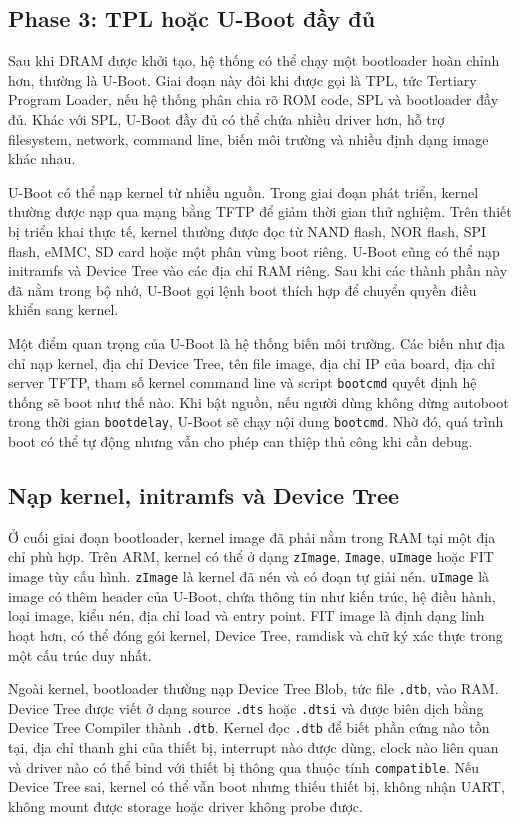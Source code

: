\documentclass[11pt]{article}
\newcommand{\code}[1]{\texttt{#1}}
\begin{document}
\subsection{Phase 3: TPL hoặc U-Boot đầy đủ}

Sau khi DRAM được khởi tạo, hệ thống có thể chạy một bootloader hoàn chỉnh hơn, thường là U-Boot. Giai đoạn này đôi khi được gọi là TPL, tức Tertiary Program Loader, nếu hệ thống phân chia rõ ROM code, SPL và bootloader đầy đủ. Khác với SPL, U-Boot đầy đủ có thể chứa nhiều driver hơn, hỗ trợ filesystem, network, command line, biến môi trường và nhiều định dạng image khác nhau.

U-Boot có thể nạp kernel từ nhiều nguồn. Trong giai đoạn phát triển, kernel thường được nạp qua mạng bằng TFTP để giảm thời gian thử nghiệm. Trên thiết bị triển khai thực tế, kernel thường được đọc từ NAND flash, NOR flash, SPI flash, eMMC, SD card hoặc một phân vùng boot riêng. U-Boot cũng có thể nạp initramfs và Device Tree vào các địa chỉ RAM riêng. Sau khi các thành phần này đã nằm trong bộ nhớ, U-Boot gọi lệnh boot thích hợp để chuyển quyền điều khiển sang kernel.

Một điểm quan trọng của U-Boot là hệ thống biến môi trường. Các biến như địa chỉ nạp kernel, địa chỉ Device Tree, tên file image, địa chỉ IP của board, địa chỉ server TFTP, tham số kernel command line và script \code{bootcmd} quyết định hệ thống sẽ boot như thế nào. Khi bật nguồn, nếu người dùng không dừng autoboot trong thời gian \code{bootdelay}, U-Boot sẽ chạy nội dung \code{bootcmd}. Nhờ đó, quá trình boot có thể tự động nhưng vẫn cho phép can thiệp thủ công khi cần debug.

\subsection{Nạp kernel, initramfs và Device Tree}

Ở cuối giai đoạn bootloader, kernel image đã phải nằm trong RAM tại một địa chỉ phù hợp. Trên ARM, kernel có thể ở dạng \code{zImage}, \code{Image}, \code{uImage} hoặc FIT image tùy cấu hình. \code{zImage} là kernel đã nén và có đoạn tự giải nén. \code{uImage} là image có thêm header của U-Boot, chứa thông tin như kiến trúc, hệ điều hành, loại image, kiểu nén, địa chỉ load và entry point. FIT image là định dạng linh hoạt hơn, có thể đóng gói kernel, Device Tree, ramdisk và chữ ký xác thực trong một cấu trúc duy nhất.

Ngoài kernel, bootloader thường nạp Device Tree Blob, tức file \code{.dtb}, vào RAM. Device Tree được viết ở dạng source \code{.dts} hoặc \code{.dtsi} và được biên dịch bằng Device Tree Compiler thành \code{.dtb}. Kernel đọc \code{.dtb} để biết phần cứng nào tồn tại, địa chỉ thanh ghi của thiết bị, interrupt nào được dùng, clock nào liên quan và driver nào có thể bind với thiết bị thông qua thuộc tính \code{compatible}. Nếu Device Tree sai, kernel có thể vẫn boot nhưng thiếu thiết bị, không nhận UART, không mount được storage hoặc driver không probe được.
\end{document}
